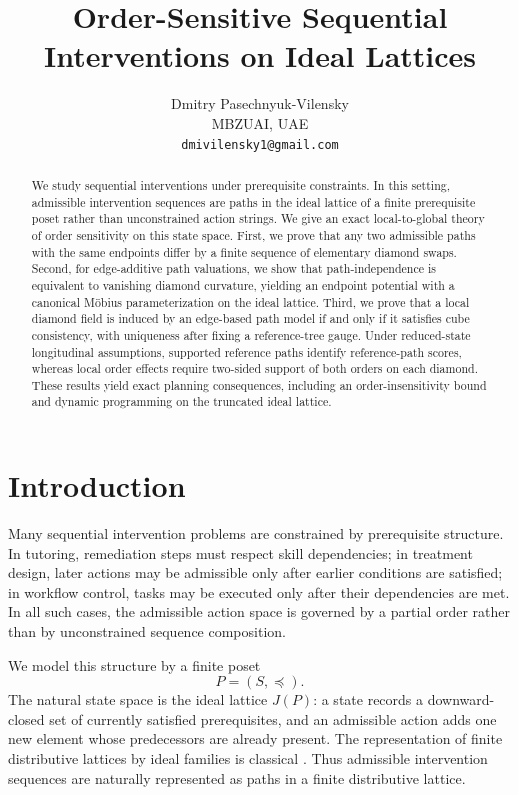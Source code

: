 \documentclass{article}
\title{Order-Sensitive Sequential Interventions on Ideal Lattices}
\author{%
  Dmitry Pasechnyuk-Vilensky\\
  MBZUAI, UAE \\
  \texttt{dmivilensky1@gmail.com} \\
}
\theoremstyle{definition}
\begin{document}
\maketitle

\begin{abstract}
We study sequential interventions under prerequisite constraints. In this setting, admissible intervention sequences are paths in the ideal lattice of a finite prerequisite poset rather than unconstrained action strings. We give an exact local-to-global theory of order sensitivity on this state space. First, we prove that any two admissible paths with the same endpoints differ by a finite sequence of elementary diamond swaps. Second, for edge-additive path valuations, we show that path-independence is equivalent to vanishing diamond curvature, yielding an endpoint potential with a canonical M\"obius parameterization on the ideal lattice. Third, we prove that a local diamond field is induced by an edge-based path model if and only if it satisfies cube consistency, with uniqueness after fixing a reference-tree gauge. Under reduced-state longitudinal assumptions, supported reference paths identify reference-path scores, whereas local order effects require two-sided support of both orders on each diamond. These results yield exact planning consequences, including an order-insensitivity bound and dynamic programming on the truncated ideal lattice.
\end{abstract}

\section{Introduction}

Many sequential intervention problems are constrained by prerequisite structure. In tutoring, remediation steps must respect skill dependencies; in treatment design, later actions may be admissible only after earlier conditions are satisfied; in workflow control, tasks may be executed only after their dependencies are met. In all such cases, the admissible action space is governed by a partial order rather than by unconstrained sequence composition.

We model this structure by a finite poset
\[
P=(S,\preceq).
\]
The natural state space is the ideal lattice \(J(P)\): a state records a downward-closed set of currently satisfied prerequisites, and an admissible action adds one new element whose predecessors are already present. The representation of finite distributive lattices by ideal families is classical \cite{birkhoff1937,davey2002,stanley2011ec1}. Thus admissible intervention sequences are naturally represented as paths in a finite distributive lattice.
\end{document}
